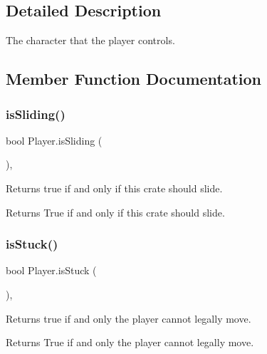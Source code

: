 \subsection{Detailed Description}
The character that the player controls. 



\subsection{Member Function Documentation}
\mbox{\label{class_player_ae7c1a20db6171c3062e9dde30ea86048}} 
\subsubsection{\texorpdfstring{is\+Sliding()}{isSliding()}}
{\footnotesize\ttfamily bool Player.\+is\+Sliding (\begin{DoxyParamCaption}{ }\end{DoxyParamCaption})\hspace{0.3cm}{\ttfamily [inline]}, {\ttfamily [protected]}}



Returns true if and only if this crate should slide. 

\begin{DoxyReturn}{Returns}
True if and only if this crate should slide. 
\end{DoxyReturn}
\mbox{\label{class_player_a3f36261a8b0622c04942d54e609da6e4}} 
\subsubsection{\texorpdfstring{is\+Stuck()}{isStuck()}}
{\footnotesize\ttfamily bool Player.\+is\+Stuck (\begin{DoxyParamCaption}{ }\end{DoxyParamCaption})\hspace{0.3cm}{\ttfamily [inline]}, {\ttfamily [protected]}}



Returns true if and only the player cannot legally move. 

\begin{DoxyReturn}{Returns}
True if and only the player cannot legally move. 
\end{DoxyReturn}
\mbox{\label{class_player_a10405c2b24c0b79a4b7033f733aceaf4}} 
